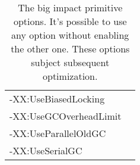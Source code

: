 \documentclass[
  digital, %
  oneside,
  notable, %
  nolof,     %
  nolot     %
]{fithesis3}
\begin{document}
\begin{table}[]
\begin{tabular}{ll}
	\multicolumn{1}{|l|}{-XX:UseBiasedLocking}                       &                                                             \\ \cline{1-1}
	\multicolumn{1}{|l|}{-XX:UseGCOverheadLimit}                     &                                                             \\ \cline{1-1}
	\multicolumn{1}{|l|}{-XX:UseParallelOldGC}                       &                                                             \\ \cline{1-1}
	\multicolumn{1}{|l|}{-XX:UseSerialGC}                            &                                                             \\ \cline{1-1}
	\end{tabular}
	\caption{The big impact primitive options. It's possible to use any option without enabling the other one. These options subject subsequent optimization.}
	\label{bigimpactprimitive}
\end{table}
		
\end{document}
